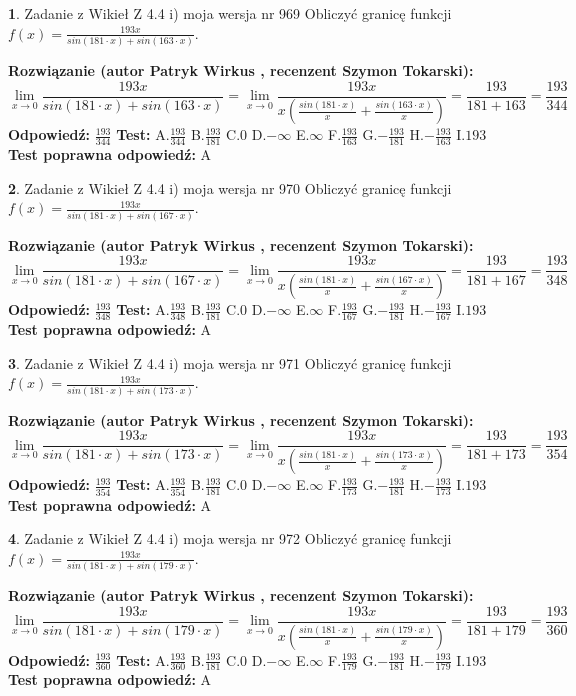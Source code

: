 \documentclass[12pt, a4paper]{article}
\theoremstyle{definition} %
\newtheorem{zad}{}
\newcommand{\zadStart}[1]{\begin{zad}#1\newline}
\newcommand{\zadStop}{\end{zad}}
\newcommand{\rozwStart}[2]{\noindent \textbf{Rozwiązanie (autor #1 , recenzent #2): }\newline}
\newcommand{\rozwStop}{\newline}
\newcommand{\odpStart}{\noindent \textbf{Odpowiedź:}\newline}
\newcommand{\odpStop}{\newline}
\newcommand{\testStart}{\noindent \textbf{Test:}\newline}
\newcommand{\testStop}{\newline}
\newcommand{\kluczStart}{\noindent \textbf{Test poprawna odpowiedź:}\newline}
\newcommand{\kluczStop}{\newline}
\begin{document}
\zadStart{Zadanie z Wikieł Z 4.4 i) moja wersja nr 969}
Obliczyć granicę funkcji $f(x)=\frac{193x}{sin(181\cdot x) +sin(163\cdot x)}$.
\zadStop
\rozwStart{Patryk Wirkus}{Szymon Tokarski}
$$\lim\limits_{x\to 0}\frac{193x}{sin(181\cdot x) +sin(163\cdot x)}=\lim\limits_{x\to 0}\frac{193x}{x(\frac{sin(181\cdot x)}{x}+\frac{sin(163\cdot x)}{x})}=\frac{193}{181+163} = \frac{193}{344}$$
\rozwStop
\odpStart
$\frac{193}{344}$
\odpStop
\testStart
A.$\frac{193}{344}$
B.$\frac{193}{181}$
C.$0$
D.$-\infty$
E.$\infty$
F.$\frac{193}{163}$
G.$-\frac{193}{181}$
H.$-\frac{193}{163}$
I.$193$
\testStop
\kluczStart
A
\kluczStop



\zadStart{Zadanie z Wikieł Z 4.4 i) moja wersja nr 970}
Obliczyć granicę funkcji $f(x)=\frac{193x}{sin(181\cdot x) +sin(167\cdot x)}$.
\zadStop
\rozwStart{Patryk Wirkus}{Szymon Tokarski}
$$\lim\limits_{x\to 0}\frac{193x}{sin(181\cdot x) +sin(167\cdot x)}=\lim\limits_{x\to 0}\frac{193x}{x(\frac{sin(181\cdot x)}{x}+\frac{sin(167\cdot x)}{x})}=\frac{193}{181+167} = \frac{193}{348}$$
\rozwStop
\odpStart
$\frac{193}{348}$
\odpStop
\testStart
A.$\frac{193}{348}$
B.$\frac{193}{181}$
C.$0$
D.$-\infty$
E.$\infty$
F.$\frac{193}{167}$
G.$-\frac{193}{181}$
H.$-\frac{193}{167}$
I.$193$
\testStop
\kluczStart
A
\kluczStop



\zadStart{Zadanie z Wikieł Z 4.4 i) moja wersja nr 971}
Obliczyć granicę funkcji $f(x)=\frac{193x}{sin(181\cdot x) +sin(173\cdot x)}$.
\zadStop
\rozwStart{Patryk Wirkus}{Szymon Tokarski}
$$\lim\limits_{x\to 0}\frac{193x}{sin(181\cdot x) +sin(173\cdot x)}=\lim\limits_{x\to 0}\frac{193x}{x(\frac{sin(181\cdot x)}{x}+\frac{sin(173\cdot x)}{x})}=\frac{193}{181+173} = \frac{193}{354}$$
\rozwStop
\odpStart
$\frac{193}{354}$
\odpStop
\testStart
A.$\frac{193}{354}$
B.$\frac{193}{181}$
C.$0$
D.$-\infty$
E.$\infty$
F.$\frac{193}{173}$
G.$-\frac{193}{181}$
H.$-\frac{193}{173}$
I.$193$
\testStop
\kluczStart
A
\kluczStop



\zadStart{Zadanie z Wikieł Z 4.4 i) moja wersja nr 972}
Obliczyć granicę funkcji $f(x)=\frac{193x}{sin(181\cdot x) +sin(179\cdot x)}$.
\zadStop
\rozwStart{Patryk Wirkus}{Szymon Tokarski}
$$\lim\limits_{x\to 0}\frac{193x}{sin(181\cdot x) +sin(179\cdot x)}=\lim\limits_{x\to 0}\frac{193x}{x(\frac{sin(181\cdot x)}{x}+\frac{sin(179\cdot x)}{x})}=\frac{193}{181+179} = \frac{193}{360}$$
\rozwStop
\odpStart
$\frac{193}{360}$
\odpStop
\testStart
A.$\frac{193}{360}$
B.$\frac{193}{181}$
C.$0$
D.$-\infty$
E.$\infty$
F.$\frac{193}{179}$
G.$-\frac{193}{181}$
H.$-\frac{193}{179}$
I.$193$
\testStop
\kluczStart
A
\kluczStop
\end{document}

